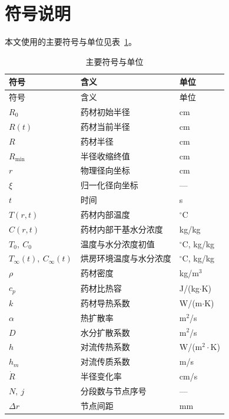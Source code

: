 \section{符号说明}

本文使用的主要符号与单位见表~\ref{tab:symbols}。

\renewcommand{\arraystretch}{0.80}
\begin{longtable}{@{}l p{7.4cm} l@{}}
  \caption{主要符号与单位}\label{tab:symbols}\\
  \toprule
  符号 & 含义 & 单位 \\
  \midrule
  \endfirsthead
  \toprule 符号 & 含义 & 单位 \\ \midrule \endhead
  \bottomrule \endfoot
  $R_0$ & 药材初始半径 & cm \\
  $R(t)$ & 药材当前半径 & cm \\
  $R$ & 药材半径 & cm \\
  $R_{\min}$ & 半径收缩终值 & cm \\
  \addlinespace[3pt]
  $r$ & 物理径向坐标 & cm \\
  $\xi$ & 归一化径向坐标 & --- \\
  \addlinespace[3pt]
  $t$ & 时间 & s \\
  $T(r,t)$ & 药材内部温度 & $^\circ$C \\
  $C(r,t)$ & 药材内部干基水分浓度 & kg/kg \\
  $T_0,\ C_0$ & 温度与水分浓度初值 & $^\circ$C, kg/kg \\
  $T_\infty(t),\ C_\infty(t)$ & 烘房环境温度与水分浓度 & $^\circ$C, kg/kg \\
  \addlinespace[3pt]
  $\rho$ & 药材密度 & kg/m$^3$ \\
  $c_p$ & 药材比热容 & J/(kg$\cdot$K) \\
  $k$ & 药材导热系数 & W/(m$\cdot$K) \\
  $\alpha$ & 热扩散率 & m$^2$/s \\
  $D$ & 水分扩散系数 & m$^2$/s \\
  $h$ & 对流传热系数 & W/(m$^2\cdot$K) \\
  $h_m$ & 对流传质系数 & m/s \\
  $\dot R$ & 半径变化率 & cm/s \\
  \addlinespace[3pt]
  $N,\ j$ & 分段数与节点序号 & --- \\
  $\Delta r$ & 节点间距 & mm \\

\end{longtable}
